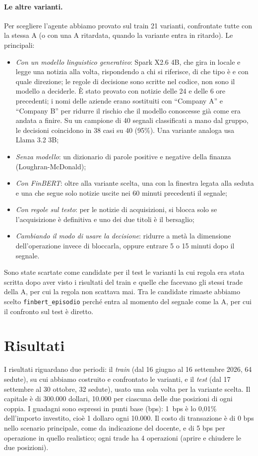 \documentclass[11pt,a4paper]{article}
\begin{document}
\paragraph{Le altre varianti.} Per scegliere l'agente abbiamo provato sul train 21 varianti, confrontate tutte con la stessa A (o con una A ritardata, quando la variante entra in ritardo). Le principali:
\begin{itemize}
  \item \emph{Con un modello linguistico generativo}: Spark X2.6 4B, che gira in locale e legge una notizia alla volta, rispondendo a chi si riferisce, di che tipo è e con quale direzione; le regole di decisione sono scritte nel codice, non sono il modello a deciderle. È stato provato con notizie delle 24 e delle 6 ore precedenti; i nomi delle aziende erano sostituiti con ``Company A'' e ``Company B'' per ridurre il rischio che il modello conoscesse già come era andata a finire. Su un campione di 40 segnali classificati a mano dal gruppo, le decisioni coincidono in 38 casi su 40 (95\%). Una variante analoga usa Llama 3.2 3B;
  \item \emph{Senza modello}: un dizionario di parole positive e negative della finanza (Loughran-\hspace{0pt}McDonald);
  \item \emph{Con FinBERT}: oltre alla variante scelta, una con la finestra legata alla seduta e una che segue solo notizie uscite nei 60 minuti precedenti il segnale;
  \item \emph{Con regole sul testo}: per le notizie di acquisizioni, si blocca solo se l'acquisizione è definitiva e uno dei due titoli è il bersaglio;
  \item \emph{Cambiando il modo di usare la decisione}: ridurre a metà la dimensione dell'operazione invece di bloccarla, oppure entrare 5 o 15 minuti dopo il segnale.
\end{itemize}
Sono state scartate come candidate per il test le varianti la cui regola era stata scritta dopo aver visto i risultati del train e quelle che facevano gli stessi trade della A, per cui la regola non scattava mai. Tra le candidate rimaste abbiamo scelto \texttt{finbert\_episodio} perché entra al momento del segnale come la A, per cui il confronto sul test è diretto.

\section{Risultati}
I risultati riguardano due periodi: il \emph{train} (dal 16 giugno al 16 settembre 2026, 64 sedute), su cui abbiamo costruito e confrontato le varianti, e il \emph{test} (dal 17 settembre al 30 ottobre, 32 sedute), usato una sola volta per la variante scelta. Il capitale è di 300.000 dollari, 10.000 per ciascuna delle due posizioni di ogni coppia. I guadagni sono espressi in punti base (bps): 1~bps è lo 0,01\% dell'importo investito, cioè 1 dollaro ogni 10.000. Il costo di transazione è di 0 bps nello scenario principale, come da indicazione del docente, e di 5 bps per operazione in quello realistico; ogni trade ha 4 operazioni (aprire e chiudere le due posizioni).
\end{document}

